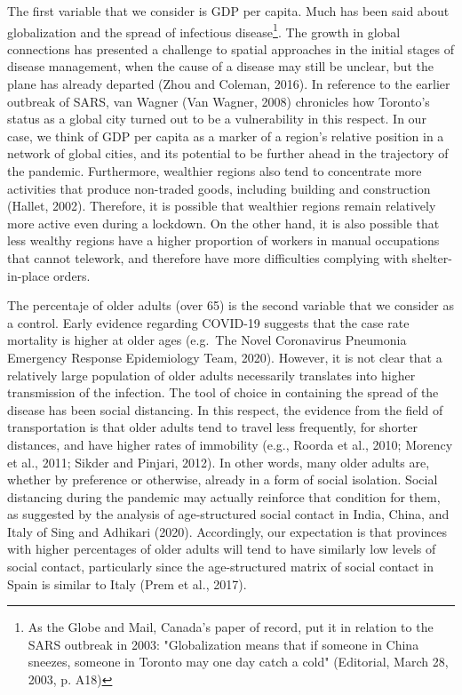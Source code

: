 \documentclass[]{elsarticle} %
\begin{document}
The first variable that we consider is GDP per capita. Much has been
said about globalization and the spread of infectious
disease\footnote{As the Globe and Mail, Canada's paper of record, put it in relation to the SARS outbreak in 2003: "Globalization means that if someone in China sneezes, someone in Toronto may one day catch a cold" (Editorial, March 28, 2003, p. A18)}.
The growth in global connections has presented a challenge to spatial
approaches in the initial stages of disease management, when the cause
of a disease may still be unclear, but the plane has already departed
(Zhou and Coleman, 2016). In reference to the earlier outbreak of SARS,
van Wagner (Van Wagner, 2008) chronicles how Toronto's status as a
global city turned out to be a vulnerability in this respect. In our
case, we think of GDP per capita as a marker of a region's relative
position in a network of global cities, and its potential to be further
ahead in the trajectory of the pandemic. Furthermore, wealthier regions
also tend to concentrate more activities that produce non-traded goods,
including building and construction (Hallet, 2002). Therefore, it is
possible that wealthier regions remain relatively more active even
during a lockdown. On the other hand, it is also possible that less
wealthy regions have a higher proportion of workers in manual
occupations that cannot telework, and therefore have more difficulties
complying with shelter-in-place orders.

The percentaje of older adults (over 65) is the second variable that we
consider as a control. Early evidence regarding COVID-19 suggests that
the case rate mortality is higher at older ages (e.g.~The Novel
Coronavirus Pneumonia Emergency Response Epidemiology Team, 2020).
However, it is not clear that a relatively large population of older
adults necessarily translates into higher transmission of the infection.
The tool of choice in containing the spread of the disease has been
social distancing. In this respect, the evidence from the field of
transportation is that older adults tend to travel less frequently, for
shorter distances, and have higher rates of immobility (e.g., Roorda et
al., 2010; Morency et al., 2011; Sikder and Pinjari, 2012). In other
words, many older adults are, whether by preference or otherwise,
already in a form of social isolation. Social distancing during the
pandemic may actually reinforce that condition for them, as suggested by
the analysis of age-structured social contact in India, China, and Italy
of Sing and Adhikari (2020). Accordingly, our expectation is that
provinces with higher percentages of older adults will tend to have
similarly low levels of social contact, particularly since the
age-structured matrix of social contact in Spain is similar to Italy
(Prem et al., 2017).
\end{document}
